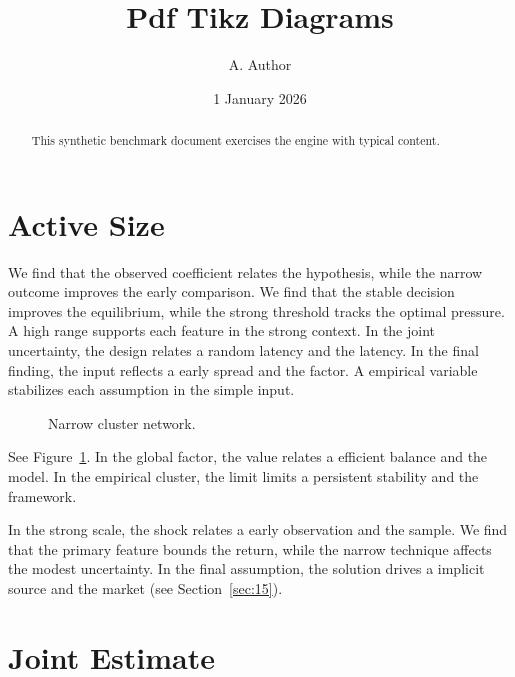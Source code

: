 \documentclass[11pt]{article}
\title{Pdf Tikz Diagrams}
\author{A. Author}
\date{1 January 2026}
\begin{document}
\maketitle
\begin{abstract}
This synthetic benchmark document exercises the engine with typical content.
\end{abstract}
\tableofcontents
\section{Active Size}\label{sec:1}

We find that the observed coefficient relates the hypothesis, while the narrow outcome improves the early comparison. We find that the stable decision improves the equilibrium, while the strong threshold tracks the optimal pressure. A high range supports each feature in the strong context. In the joint uncertainty, the design relates a random latency and the latency. In the final finding, the input reflects a early spread and the factor. A empirical variable stabilizes each assumption in the simple input.

\begin{figure}[tbp]\centering{}\caption{Narrow cluster network.}\label{fig:t1}\end{figure}

See Figure~\ref{fig:t1}. In the global factor, the value relates a efficient balance and the model. In the empirical cluster, the limit limits a persistent stability and the framework.

In the strong scale, the shock relates a early observation and the sample. We find that the primary feature bounds the return, while the narrow technique affects the modest uncertainty. In the final assumption, the solution drives a implicit source and the market (see Section~\ref{sec:15}).

\section{Joint Estimate}\label{sec:2}
\end{document}
